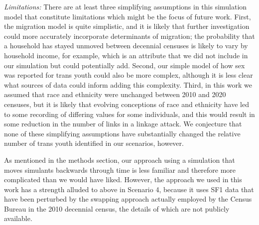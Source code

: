 \documentclass{jpc} %
\theoremstyle{plain}\newtheorem{satz}[thm]{Satz} %
\begin{document}
\emph{Limitations:}
There are at least three simplifying assumptions in this simulation model that constitute limitations which might be the focus of future work.  First, the migration model is quite simplistic, and it is likely that further investigation could more accurately incorporate determinants of migration; the probability that a household has stayed unmoved between decennial censuses is likely to vary by household income, for example, which is an attribute that we did not include in our simulation but could potentially add.
Second, our simple model of how sex was reported for trans youth could also be more complex, although it is less clear what sources of data could inform adding this complexity. Third, in this work we assumed that race and ethnicity were unchanged between 2010 and 2020 censuses, but it is likely that evolving conceptions of race and ethnicity have led to some recording of differing values for some individuals, and this would result in some reduction in the number of links in a linkage attack.  We conjecture that none of these simplifying assumptions have substantially changed the relative number of trans youth identified in our scenarios, however.

As mentioned in the methods section, our approach using a simulation that moves simulants backwards through time is less familiar and therefore more complicated than we would have liked.  However, the approach we used in this work has a strength alluded to above in Scenario 4, because it uses SF1 data that have been perturbed by the swapping approach actually employed by the Census Bureau in the 2010 decennial census, the details of which are not publicly available.
\end{document}
